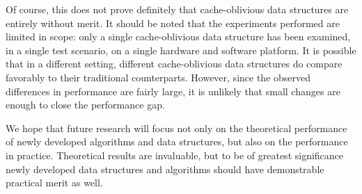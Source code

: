 \documentclass{acm_proc_article-sp}
\begin{document}
Of course, this does not prove definitely that cache-oblivious data structures
are entirely without merit. It should be noted that the experiments performed
are limited in scope: only a single cache-oblivious data structure has been
examined, in a single test scenario, on a single hardware
and software platform. It is possible that in a different setting,
different cache-oblivious data structures do compare favorably to their traditional
counterparts. However, since the observed differences in performance are fairly
large, it is unlikely that small changes are enough to close the performance gap.

We hope that future research will focus not only on the theoretical performance
of newly developed algorithms and data structures, but also on the performance
in practice. Theoretical results are invaluable, but to be of greatest
significance newly developed data structures and algorithms should have
demonstrable practical merit as well.



\end{document}
